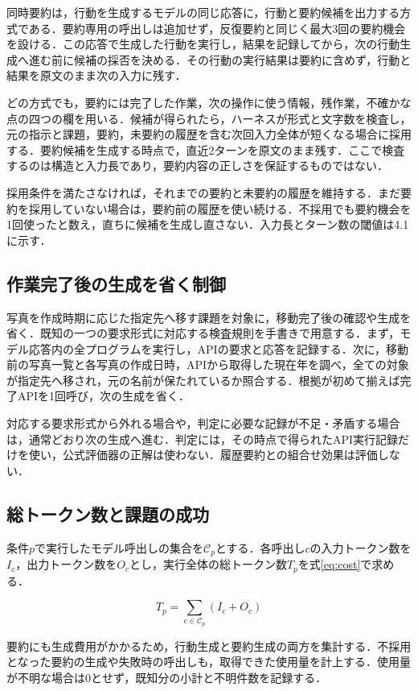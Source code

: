 \documentclass[letter]{ieicej}
\begin{document}
同時要約は，行動を生成するモデルの同じ応答に，行動と要約候補を出力する方式である．要約専用の呼出しは追加せず，反復要約と同じく最大3回の要約機会を設ける．この応答で生成した行動を実行し，結果を記録してから，次の行動生成へ進む前に候補の採否を決める．その行動の実行結果は要約に含めず，行動と結果を原文のまま次の入力に残す．

どの方式でも，要約には完了した作業，次の操作に使う情報，残作業，不確かな点の四つの欄を用いる．候補が得られたら，ハーネスが形式と文字数を検査し，元の指示と課題，要約，未要約の履歴を含む次回入力全体が短くなる場合に採用する．要約候補を生成する時点で，直近2ターンを原文のまま残す．ここで検査するのは構造と入力長であり，要約内容の正しさを保証するものではない．

採用条件を満たさなければ，それまでの要約と未要約の履歴を維持する．まだ要約を採用していない場合は，要約前の履歴を使い続ける．不採用でも要約機会を1回使ったと数え，直ちに候補を生成し直さない．入力長とターン数の閾値は4.1に示す．

\subsection{作業完了後の生成を省く制御}

写真を作成時期に応じた指定先へ移す課題を対象に，移動完了後の確認や生成を省く．既知の一つの要求形式に対応する検査規則を手書きで用意する．まず，モデル応答内の全プログラムを実行し，APIの要求と応答を記録する．次に，移動前の写真一覧と各写真の作成日時，APIから取得した現在年を調べ，全ての対象が指定先へ移され，元の名前が保たれているか照合する．根拠が初めて揃えば完了APIを1回呼び，次の生成を省く．

対応する要求形式から外れる場合や，判定に必要な記録が不足・矛盾する場合は，通常どおり次の生成へ進む．判定には，その時点で得られたAPI実行記録だけを使い，公式評価器の正解は使わない．履歴要約との組合せ効果は評価しない．

\begin{samepage}
\subsection{総トークン数と課題の成功}

条件$p$で実行したモデル呼出しの集合を$\mathcal C_p$とする．各呼出し$c$の入力トークン数を$I_c$，出力トークン数を$O_c$とし，実行全体の総トークン数$T_p$を\mbox{式\eqref{eq:cost}で求める．}

\begin{equation}
 T_p=\sum_{c\in\mathcal C_p}(I_c+O_c)
 \label{eq:cost}
\end{equation}

要約にも生成費用がかかるため，行動生成と要約生成の両方を集計する．不採用となった要約の生成や失敗時の呼出しも，取得できた使用量を計上する．使用量が不明な場合は0とせず，既知分の小計と不明件数を記録する．

\end{samepage}
\end{document}
